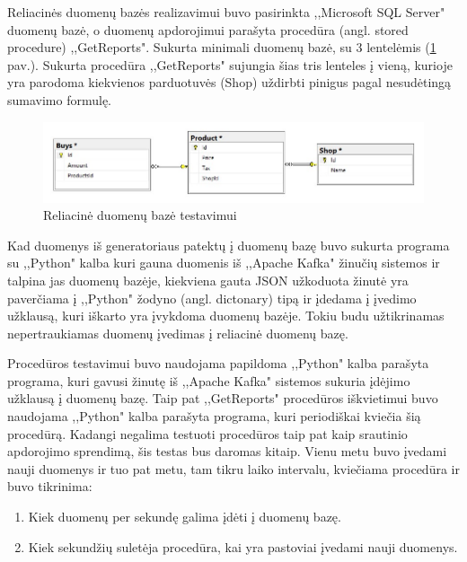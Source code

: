 \documentclass{VUMIFPSkursinis}
\begin{document}
Reliacinės duomenų bazės realizavimui buvo pasirinkta ,,Microsoft SQL Server" duomenų bazė, o duomenų apdorojimui parašyta procedūra (angl. stored procedure) ,,GetReports".
Sukurta minimali duomenų bazė, su 3 lentelėmis (\ref{fig:dbdiagram} pav.). Sukurta procedūra ,,GetReports" sujungia šias tris lenteles į vieną, kurioje yra parodoma kiekvienos 
parduotuvės (Shop) uždirbti pinigus pagal nesudėtingą sumavimo formulę.
\begin{figure}[!htbp]
    \centering
    \includegraphics[width=1\textwidth]{img/dbdiagram.jpg}
    \caption{Reliacinė duomenų bazė testavimui}
    \label{fig:dbdiagram}
\end{figure}
Kad duomenys iš generatoriaus patektų į duomenų bazę buvo sukurta programa su ,,Python" kalba kuri gauna duomenis iš ,,Apache Kafka" žinučių sistemos ir talpina jas
duomenų bazėje, kiekviena gauta JSON užkoduota žinutė yra paverčiama į ,,Python" žodyno (angl. dictonary) tipą ir įdedama į įvedimo užklausą, kuri iškarto yra 
įvykdoma duomenų bazėje. Tokiu budu užtikrinamas nepertraukiamas duomenų įvedimas į reliacinė duomenų bazę.\par
Procedūros testavimui buvo naudojama papildoma ,,Python" kalba parašyta programa, kuri gavusi žinutę iš ,,Apache Kafka" sistemos sukuria įdėjimo užklausą į duomenų bazę.
Taip pat ,,GetReports" procedūros iškvietimui buvo naudojama ,,Python" kalba parašyta programa, kuri periodiškai kviečia šią procedūrą. 
Kadangi negalima testuoti procedūros taip pat kaip srautinio apdorojimo sprendimą, šis testas bus daromas kitaip.
Vienu metu buvo įvedami nauji duomenys ir tuo pat metu, tam tikru laiko intervalu, kviečiama procedūra ir buvo tikrinima:
    \begin{enumerate}
        \item Kiek duomenų per sekundę galima įdėti į duomenų bazę.
        \item Kiek sekundžių suletėja procedūra, kai yra pastoviai įvedami nauji duomenys.
    \end{enumerate}
\end{document}
